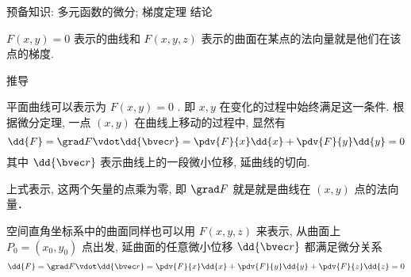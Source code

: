 
预备知识: 多元函数的微分; 梯度定理
结论

$F(x, y) = 0$ 表示的曲线和 $F(x, y, z)$ 表示的曲面在某点的法向量就是他们在该点的梯度.

推导

平面曲线可以表示为 $F(x, y) = 0$ . 即 $x, y$ 在变化的过程中始终满足这一条件. 根据微分定理, 一点 $(x, y)$ 在曲线上移动的过程中, 显然有
\begin{equation}
\dd{F} = \grad F \vdot \dd{\bvec r} = \pdv{F}{x} \dd{x} + \pdv{F}{y} \dd{y} = 0
\end{equation}
其中 $\dd{\bvec r}$ 表示曲线上的一段微小位移, 延曲线的切向.

上式表示, 这两个矢量的点乘为零, 即 $\grad F$ 就是就是曲线在 $(x,y)$ 点的法向量．

空间直角坐标系中的曲面同样也可以用 $F(x, y, z)$ 来表示, 从曲面上 $P_0 = (x_0, y_0)$ 点出发, 延曲面的任意微小位移 $\dd{\bvec r}$ 都满足微分关系
\begin{equation}
\dd{F} = \grad F \vdot \dd{\bvec r} = \pdv{F}{x} \dd{x} + \pdv{F}{y} \dd{y} + \pdv{F}{z} \dd{z} = 0
\end{equation}
